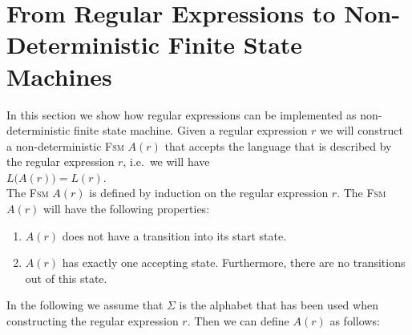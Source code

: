 \section{From Regular Expressions to Non-Deterministic Finite State Machines}
In this section we show how regular expressions can be implemented as non-deterministic finite state machine.
Given a regular expression $r$ we will construct a non-deterministic \textsc{Fsm} $A(r)$ that accepts the
language that is described by the regular expression $r$, i.e.~we will have
\\[0.2cm]
\hspace*{1.3cm}
$L\bigl(A(r)\bigr) = L(r)$.
\\[0.2cm]
The \textsc{Fsm} $A(r)$ is defined by induction on the regular expression $r$.  The \textsc{Fsm} $A(r)$ will
have the following properties:
\begin{enumerate}
\item $A(r)$ does not have a transition into its start state.  
\item $A(r)$ has exactly one accepting state.  
      Furthermore, there are no transitions out of this state.
\end{enumerate}
In the following we assume that $\Sigma$ is the alphabet that has been used when constructing the regular
expression $r$.  Then we can define $A(r)$ as follows:
